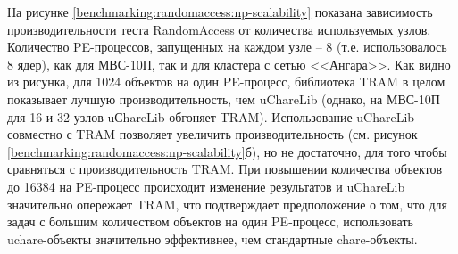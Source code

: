 \documentclass[11pt, oneside, a4paper]{article}
\begin{document}
На рисунке \ref{benchmarking:randomaccess:np-scalability} показана зависимость производительности теста RandomAccess от количества
используемых узлов. Количество PE-процессов, запущенных на каждом узле -- 8 (т.е. использовалось 8 ядер), как для МВС-10П, так и для
кластера с сетью <<Ангара>>. Как видно из рисунка, для 1024 объектов на один PE-процесс, библиотека TRAM в целом показывает лучшую 
производительность, чем uChareLib (однако, на МВС-10П для 16 и 32 узлов uСhareLib обгоняет TRAM). 
Использование uChareLib совместно с TRAM позволяет увеличить производительность (см. рисунок \ref{benchmarking:randomaccess:np-scalability}б),
но не достаточно, для того чтобы сравняться с производительность TRAM.
При повышении количества объектов до 16384 на PE-процесс происходит изменение результатов и uChareLib значительно опережает TRAM,
что подтверждает предположение о том, что для задач с большим количеством объектов на один PE-процесс, использовать uchare-объекты
значительно эффективнее, чем стандартные chare-объекты.
\end{document}
